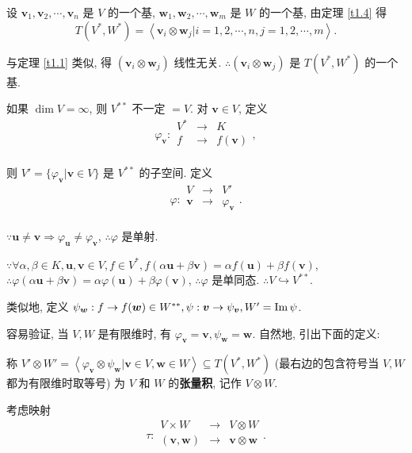 \documentclass{ctexart}
\begin{document}
设 $\boldsymbol{v}_1,\boldsymbol{v}_2,\cdots,\boldsymbol{v}_n$ 是 $V$ 的一个基, $\boldsymbol{w}_1,\boldsymbol{w}_2,\cdots,\boldsymbol{w}_m$ 是 $W$ 的一个基, 由定理 \ref{t1.4} 得
\[T(V^*,W^*)=\left<\boldsymbol{v}_i\otimes\boldsymbol{w}_j|i=1,2,\cdots,n,j=1,2,\cdots,m\right>.\]

与定理 \ref{t1.1} 类似, 得 $(\boldsymbol{v}_i\otimes\boldsymbol{w}_j)$ 线性无关. $\therefore(\boldsymbol{v}_i\otimes\boldsymbol{w}_j)$ 是 $T(V^*,W^*)$ 的一个基.

如果 $\dim V=\infty$, 则 $V^{**}$ 不一定 $=V$. 对 $\boldsymbol{v}\in V$, 定义
\[\varphi_{\boldsymbol{v}}:\begin{array}{rcl}
    V^* & \to & K \\
    f & \to & f(\boldsymbol{v}) \\
\end{array},\]

则 $V'=\{\varphi_{\boldsymbol{v}}|\boldsymbol{v}\in V\}$ 是 $V^{**}$ 的子空间. 定义
\[\varphi:\begin{array}{rcl}
    V & \to & V' \\
    \boldsymbol{v} & \to & \varphi_{\boldsymbol{v}} \\
\end{array}.\]

$\because\boldsymbol{u}\neq\boldsymbol{v}\Rightarrow\varphi_{\boldsymbol{u}}\neq\varphi_{\boldsymbol{v}}$, $\therefore\varphi$ 是单射.

$\because\forall\alpha,\beta\in K,\boldsymbol{u},\boldsymbol{v}\in V,f\in V^*,f(\alpha\boldsymbol{u}+\beta\boldsymbol{v})=\alpha f(\boldsymbol{u})+\beta f(\boldsymbol{v})$, $\therefore\varphi(\alpha\boldsymbol{u}+\beta\boldsymbol{v})=\alpha\varphi(\boldsymbol{u})+\beta\varphi(\boldsymbol{v})$, $\therefore\varphi$ 是单同态. $\therefore V\hookrightarrow V^{**}$.

类似地, 定义 $\psi_{\boldsymbol{w}}:f\to f(\boldsymbol{w})\in W^{**},\psi:\boldsymbol{v}\to\psi_{\boldsymbol{v}},W'=\operatorname{Im} \psi$.

容易验证, 当 $V,W$ 是有限维时, 有 $\varphi_{\boldsymbol{v}}=\boldsymbol{v},\psi_{\boldsymbol{w}}=\boldsymbol{w}$. 自然地, 引出下面的定义:
\begin{definition}\label{d1.2}
    称 $V'\otimes W'=\left<\varphi_{\boldsymbol{v}}\otimes\psi_{\boldsymbol{w}}|\boldsymbol{v}\in V,\boldsymbol{w}\in W\right>\subseteq T(V^*,W^*)$ (最右边的包含符号当 $V,W$ 都为有限维时取等号) 为 $V$ 和 $W$ 的\textbf{张量积}, 记作 $V\otimes W$.
\end{definition}
考虑映射
\[\tau:\begin{array}{rcl}
    V\times W & \to & V\otimes W \\
    (\boldsymbol{v},\boldsymbol{w}) & \to & \boldsymbol{v}\otimes\boldsymbol{w} \\
\end{array}.\]
\end{document}

